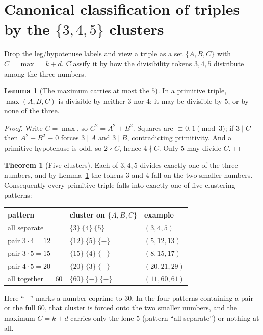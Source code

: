 \documentclass[11pt]{article}
\theoremstyle{definition}
\newtheorem{lemma}{Lemma}
\newtheorem{theorem}{Theorem}
\begin{document}
\section{Canonical classification of triples by the $\{3,4,5\}$ clusters}

Drop the leg/hypotenuse labels and view a triple as a set $\{A,B,C\}$ with
$C=\max=k+d$. Classify it by how the divisibility tokens $3,4,5$ distribute
among the three numbers.

\begin{lemma}[The maximum carries at most the $5$]\label{lem:maxfive}
In a primitive triple, $\max(A,B,C)$ is divisible by neither $3$ nor $4$; it may
be divisible by $5$, or by none of the three.
\end{lemma}

\begin{proof}
Write $C=\max$, so $C^{2}=A^{2}+B^{2}$. Squares are $\equiv 0,1\pmod 3$; if
$3\mid C$ then $A^{2}+B^{2}\equiv 0$ forces $3\mid A$ and $3\mid B$, contradicting
primitivity. And a primitive hypotenuse is odd, so $2\nmid C$, hence $4\nmid C$.
Only $5$ may divide $C$.
\end{proof}

\begin{theorem}[Five clusters]\label{thm:clusters}
Each of $3,4,5$ divides exactly one of the three numbers, and by
Lemma~\ref{lem:maxfive} the tokens $3$ and $4$ fall on the two smaller numbers.
Consequently every primitive triple falls into exactly one of five clustering
patterns:
\end{theorem}

\begin{center}
\renewcommand{\arraystretch}{1.2}
\begin{tabular}{lll}
\hline
pattern & cluster on $\{A,B,C\}$ & example\\
\hline
all separate     & $\{3\}\ \{4\}\ \{5\}$      & $(3,4,5)$\\
pair $3\cdot4=12$ & $\{12\}\ \{5\}\ \{-\}$    & $(5,12,13)$\\
pair $3\cdot5=15$ & $\{15\}\ \{4\}\ \{-\}$    & $(8,15,17)$\\
pair $4\cdot5=20$ & $\{20\}\ \{3\}\ \{-\}$    & $(20,21,29)$\\
all together $=60$ & $\{60\}\ \{-\}\ \{-\}$   & $(11,60,61)$\\
\hline
\end{tabular}
\end{center}

\noindent Here ``$-$'' marks a number coprime to $30$. In the four patterns
containing a pair or the full $60$, that cluster is forced onto the two smaller
numbers, and the maximum $C=k+d$ carries only the lone $5$ (pattern ``all
separate'') or nothing at all.
\end{document}
